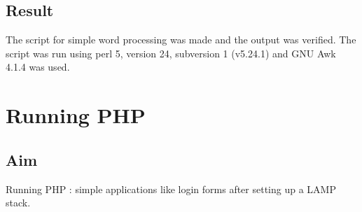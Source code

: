 \documentclass{article}
\begin{document}
\subsection{Result}
The script for simple word processing was made and the output was verified. The script was run using perl 5, version 24, subversion 1 (v5.24.1) and GNU Awk 4.1.4 was used. 

\begin{refsection}
\cite{perlbook}
\cite{perlweb}
\printbibliography
\end{refsection}

\newpage
\section{Running PHP}

\subsection{Aim}
Running PHP : simple applications like login forms after setting up a LAMP stack.
\end{document}
